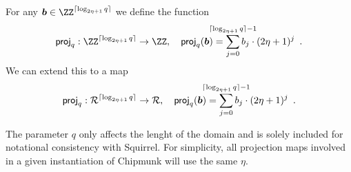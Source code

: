 \begin{definition}\label{def:proj}
  For any $\vec{b} \in \ZZ^{\lceil\log_{2\eta+1} q\rceil}$ we define the function 
  \[
    \proj_q : \ZZ^{\lceil\log_{2\eta+1} q\rceil} \to \ZZ,\quad \proj_q(\vec{b}) = \smashoperator{\sum_{j=0}^{\lceil\log_{2\eta+1} q\rceil-1}} b_j\cdot(2\eta+1)^{j}\enspace.
  \]
  We can extend this to a map 
  \[
    \proj_q : \ring^{\lceil\log_{2\eta+1} q\rceil} \to \ring,\quad \proj_q(\vec{b}) = \smashoperator{\sum_{j=0}^{\lceil\log_{2\eta+1} q\rceil-1}} b_j\cdot(2\eta+1)^{j}\enspace.
  \]
\end{definition}
The parameter $q$ only affects the lenght of the domain and is solely included for notational consistency with Squirrel. 
For simplicity, all projection maps involved in a given instantiation of Chipmunk will use the same $\eta$.

